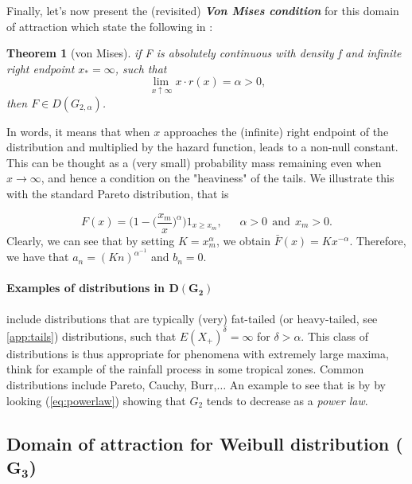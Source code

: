 \documentclass[11pt,a4paper,openany ]{book}
\newtheorem{theorem}{Theorem}[chapter]
\begin{document}
Finally, let's now present the (revisited) \emph{\textbf{Von Mises condition}} for this domain of attraction which state the following in \cite{falk_von_1993}:

\begin{theorem}[von Mises]
if F is absolutely continuous with density f and infinite right endpoint $x_*=\infty$, such that 
\begin{equation*}
\displaystyle{\lim_{ \ x \uparrow \infty}} x \cdot r(x)=\alpha>0,
\end{equation*}
then $F\in D(G_{2,\alpha})$.
\end{theorem}
In words, it means that when $x$ approaches the (infinite) right endpoint of the distribution and multiplied by the hazard function, leads to a non-null constant. This can be thought as a (very small) probability mass remaining even when $x\to\infty$, and hence a condition on the "heaviness" of the tails.
We illustrate this with the standard Pareto distribution, that is 

\begin{equation*}
F(x)=\bigg(1-\big(\frac{x_m}{x}\big)^{\alpha}\bigg)1_{x\geq x_m}, \ \ \ \ \ \ \ \alpha>0 \  \ \text{and} \ \ x_m>0.
\end{equation*}
Clearly, we can see that by setting $K=x_m^{\alpha}$, we obtain $\bar{F}(x)=Kx^{-\alpha}$.
Therefore, we have that $a_n=(Kn)^{\alpha^{-1}}$ and $b_n=0$.

\paragraph*{Examples of distributions in $\boldsymbol{D(G_{2})}$} include distributions that are typically (very) fat-tailed (or heavy-tailed, see \hyperref[app:tails]{\ref{app:tails}}) distributions, such that $E(X_+)^{\delta}=\infty$ for $\delta>\alpha$. This class of distributions is thus appropriate for phenomena with extremely large maxima, think for example of the rainfall process in some tropical zones. Common distributions include Pareto, Cauchy, Burr,$\dots$
An example to see that is by by looking (\ref{eq:powerlaw})
showing that $G_{2}$ tends to decrease as a \emph{power law}.


\subsection*{Domain of attraction for Weibull distribution ($\mathbf{G_{3}}$) }
\end{document}
